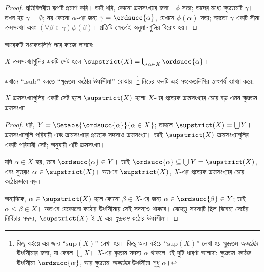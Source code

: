 \documentclass[../../../include/open-logic-section]{subfiles}
\begin{document}
\begin{proof}
প্রতিবিপরীত রূপটি প্রমাণ করি। তাই ধরি, কোনো ক্রমসংখ্যার
জন্য $\lnot\phi$ সত্য; তাদের মধ্যে ক্ষুদ্রতমটি
$\gamma$। তখন হয় $\gamma = \emptyset$; নয়
কোনো $\alpha$-এর জন্য $\gamma = \ordsucc{\alpha}$,
যেখানে $\phi(\alpha)$ সত্য; নয়তো $\gamma$ একটি
সীমা ক্রমসংখ্যা এবং $(\forall
\beta \in \gamma)\phi(\beta)$। প্রতিটি ক্ষেত্রেই
অনুমানগুলির বিরোধ হয়।
\end{proof}
\noindent
আরেকটি সংকেতলিপি পরে কাজে লাগবে:

\begin{defn}
$X$ ক্রমসংখ্যাগুলির একটি সেট হলে $\supstrict(X) = \bigcup_{\alpha
\in X} \ordsucc{\alpha}$।
\end{defn}
\noindent
এখানে ``lsub'' বলতে ``ক্ষুদ্রতম কঠোর ঊর্ধ্বসীমা'' বোঝায়।\footnote{কিছু
বইয়ে এর জন্য ``$\text{sup}(X)$'' লেখা হয়। কিন্তু অন্য
বইয়ে ``$\text{sup}(X)$'' লেখা হয় ক্ষুদ্রতম
\emph{অকঠোর} ঊর্ধ্বসীমার জন্য, যা কেবল $\bigcup X$।
$X$-এর বৃহত্তম সদস্য $\alpha$ থাকলে এই দুটি ধারণা
আলাদা: ক্ষুদ্রতম \emph{কঠোর} ঊর্ধ্বসীমা
$\ordsucc{\alpha}$, আর ক্ষুদ্রতম \emph{অকঠোর}
ঊর্ধ্বসীমা শুধু $\alpha$।} নিচের ফলটি এই
সংকেতলিপির তাৎপর্য ব্যাখ্যা করে:

\begin{prop}
$X$ ক্রমসংখ্যাগুলির একটি সেট হলে $\supstrict(X)$
হলো $X$-এর প্রত্যেক ক্রমসংখ্যার চেয়ে বড় এমন
ক্ষুদ্রতম ক্রমসংখ্যা।
\end{prop}

\begin{proof}
ধরি, $Y = \Setabs{\ordsucc{\alpha}}{\alpha \in X}$;
তাহলে $\supstrict(X) = \bigcup Y$। ক্রমসংখ্যাগুলি
পরিযায়ী এবং ক্রমসংখ্যার প্রত্যেক সদস্যও ক্রমসংখ্যা।
তাই $\supstrict(X)$ ক্রমসংখ্যাগুলির একটি পরিযায়ী
সেট;  অনুযায়ী
এটি ক্রমসংখ্যা।

যদি $\alpha \in X$ হয়, তবে $\ordsucc{\alpha} \in Y$।
তাই $\ordsucc{\alpha}
\subseteq \bigcup Y = \supstrict(X)$, এবং সুতরাং
$\alpha \in
\supstrict(X)$। অতএব $\supstrict(X)$, $X$-এর
প্রত্যেক ক্রমসংখ্যার চেয়ে কঠোরভাবে বড়।

অন্যদিকে, $\alpha \in \supstrict(X)$ হলে
কোনো $\beta \in X$-এর জন্য $\alpha \in
\ordsucc{\beta} \in Y$; তাই $\alpha \leq
\beta \in X$। অতএব যেকোনো কঠোর
ঊর্ধ্বসীমায় সেই সদস্যও থাকবে। যেহেতু
সদস্যটি ছিল বিবেচ্য সেটের নির্বিচার সদস্য,
$\supstrict(X)$-ই $X$-এর \emph{ক্ষুদ্রতম} কঠোর
ঊর্ধ্বসীমা।
\end{proof}
\end{document}
